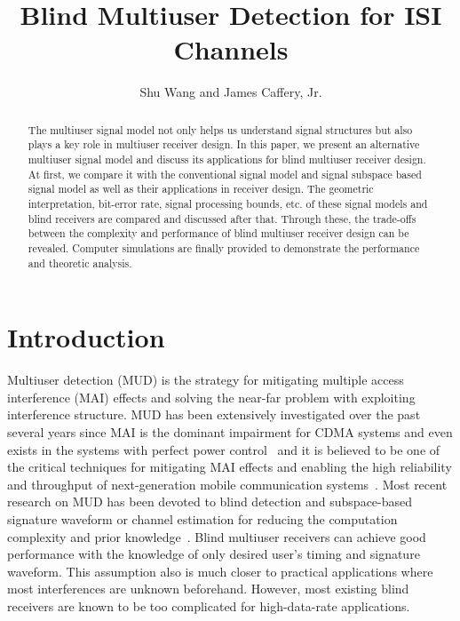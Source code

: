 \documentclass[a4paper,10pt,fleqn, twocolumn]{IEEETran}
\title{Blind Multiuser Detection for ISI Channels}
\author{Shu Wang and James Caffery, Jr.}
\date{}
\begin{document}
\maketitle
\begin{abstract}\small
The multiuser signal model not only helps us understand signal
structures but also plays a key role in multiuser receiver design.
In this paper, we present an alternative multiuser signal model
and discuss its applications for blind multiuser receiver design.
At first, we compare it with the conventional signal model and
signal subspace based signal model as well as their applications
in receiver design. The geometric interpretation, bit-error rate,
signal processing bounds, etc. of these signal models and blind
receivers are compared and discussed after that. Through these,
the trade-offs between the complexity and performance of blind
multiuser receiver design can be revealed. Computer simulations
are finally provided to demonstrate the performance and theoretic
analysis.
\end{abstract}
\section{Introduction}
Multiuser detection (MUD) is the strategy for mitigating multiple
access interference (MAI) effects and solving the near-far problem
with exploiting interference structure. MUD has been extensively
investigated over the past several years since MAI is the dominant
impairment for CDMA systems and even exists in the systems with
perfect power control~\cite{Verd98} and it is believed to be one
of the critical techniques for mitigating MAI effects and enabling
the high reliability and throughput of next-generation mobile
communication systems~\cite{Andr05}. Most recent research on MUD
has been devoted to blind detection and subspace-based signature
waveform or channel estimation for reducing the computation
complexity and prior
knowledge~\cite{Honi95,Torl97,Wang98,Zhang02,Wang03d,Wang05A,Wang05B}.
Blind multiuser receivers can achieve good performance with the
knowledge of only desired user's timing and signature waveform.
This assumption also is much closer to practical applications
where most interferences are unknown beforehand. However, most
existing blind receivers are known to be too complicated for
high-data-rate applications.
\end{document}
